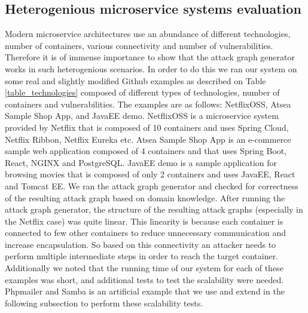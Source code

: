 \subsection{Heterogenious microservice systems evaluation}
\label{chap:heterogenious_systems}
Modern microservice architectures use an abundance of different technologies, number of containers, various connectivity and number of vulnerabilities. Therefore it is of immense importance to show that the attack graph generator works in such heterogenious scenarios. In order to do this we ran our system on some real and slightly modified Github examples as described on Table \ref{table_technologies} composed of different types of technologies, number of containers and vulnerabilities. The examples are as follows: NetflixOSS, Atsea Sample Shop App, and JavaEE demo. NetflixOSS is a microservice system provided by Netflix that is composed of 10 containers and uses Spring Cloud, Netflix Ribbon, Netflix Eureka etc. Atsea Sample Shop App is an e-commerce sample web application composed of 4 containers and that uses Spring Boot, React, NGINX and PostgreSQL. JavaEE demo is a sample application for browsing movies that is composed of only 2 containers and uses JavaEE, React and Tomcat EE. We ran the attack graph generator and checked for correctness of the resulting attack graph based on domain knowledge. After running the attack graph generator, the structure of the resulting attack graphs (especially in the Netflix case) was quite linear. This linearity is because each container is connected to few other containers to reduce unnecessary communication and increase encapsulation. So based on this connectivity an attacker needs to perform multiple intermediate steps in order to reach the target container. Additionally we noted that the running time of our system for each of these examples was short, and additional tests to test the scalability were needed. Phpmailer and Samba is an artificial example that we use and extend in the following subsection to perform these scalability tests.
	
